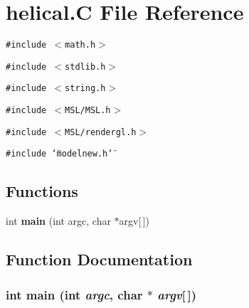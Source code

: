 \section{helical.C File Reference}
\label{helical_C}
{\tt \#include $<$math.h$>$}\par
{\tt \#include $<$stdlib.h$>$}\par
{\tt \#include $<$string.h$>$}\par
{\tt \#include $<$MSL/MSL.h$>$}\par
{\tt \#include $<$MSL/rendergl.h$>$}\par
{\tt \#include \char`\"{}modelnew.h\char`\"{}}\par
\subsection*{Functions}
\begin{CompactItemize}
\item 
int {\bf main} (int argc, char $\ast$argv[$\,$])
\end{CompactItemize}


\subsection{Function Documentation}
\subsubsection{\setlength{\rightskip}{0pt plus 5cm}int main (int {\em argc}, char $\ast$ {\em argv}[$\,$])}\label{helical_C_a0}



